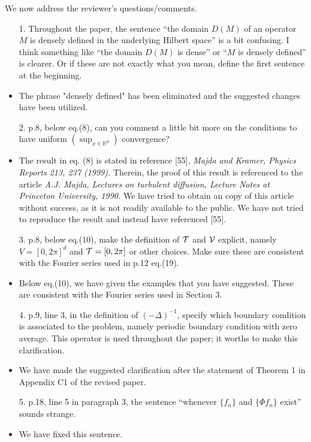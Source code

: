 \documentclass[amsa]{article}
\begin{document}
We now address the reviewer's questions/comments.



\begin{itemize}
\item[1.]
  Throughout the paper, the sentence “the domain $D(M)$ of an operator
  $M$ is densely defined in the underlying Hilbert space” is a bit
  confusing. I think something like “the domain $D(M)$ is dense” or
  “$M$ is densely defined” is clearer. Or if these are not exactly
  what you mean, define the first sentence at the beginning.
%
\item
  The phrase "densely defined" has been eliminated and the suggested
  changes have been utilized.
%
\item[2.]
  p.8, below eq.(8), can you comment a little bit more on the
  conditions to have uniform $(\sup_{x\in\mathbb{R}^d})$ convergence?
%
\item
  The result in eq. (8) is stated in reference [55], \textit{Majda and
    Kramer, Physics Reports 213, 237 (1999).} Therein, the proof of
  this result is referenced to the article \textit{A.J. Majda,
    Lectures on turbulent diffusion, Lecture Notes at Princeton
    University, 1990.} We have tried to obtain an copy of this article
  without success, as it is not readily available to the public. We
  have not tried to reproduce the result and instead have referenced
  [55].  
%
\item[3.]
  p.8, below eq.(10), make the definition of $\mathcal{T}$ and $\mathcal{V}$ explicit,
  namely $V = [0, 2\pi]^d$ and $\mathcal{T} = [0, 2\pi]$ or other
  choices. Make sure these are consistent with the Fourier series used
  in p.12 eq.(19).
%
\item
  Below eq.(10), we have given the examples that you have
  suggested. These are consistent with the Fourier series used in
  Section 3. 
%
\item[4.]
  p.9, line 3, in the definition of $(-\Delta)^{-1}$, specify which
  boundary condition is associated to the  problem, namely periodic
  boundary condition with zero average. This operator is used
  throughout the paper; it worths to make this clarification.
%
\item
  We have made the suggested clarification after the statement of
  Theorem 1 in Appendix C1 of the revised paper. 
%
\item[5.] p.18, line 5 in paragraph 3, the sentence “whenever $\{f_n\}$
  and $\{\Phi f_n\}$ exist” sounds strange.
%
\item
  We have fixed this sentence.

\end{itemize}
\end{document}
